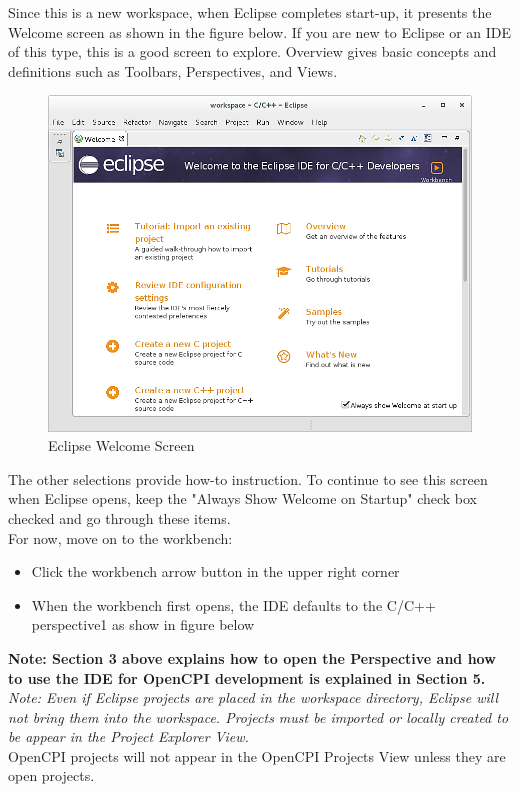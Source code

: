 \documentclass[10pt, a4paper, oneside]{article}
\begin{document}
Since this is a new workspace, when Eclipse completes start-up, it presents the Welcome screen as shown in the figure below. If you are new to Eclipse or an IDE of this type, this is a good screen to explore. Overview gives basic concepts and definitions such as Toolbars, Perspectives, and Views.
\begin{figure}[h!]
	\centering
	\caption{Eclipse Welcome Screen}{}
	\includegraphics[width=.70\textwidth]{EclipseWelcomeScreen.png}
 \end{figure}
The other selections provide how-to instruction. To continue to see this screen when Eclipse opens, keep the "Always Show Welcome on Startup" check box checked and go through these items. \\

For now, move on to the workbench:
\begin{itemize}
\item Click the workbench arrow button in the upper right corner
\item When the workbench first opens, the IDE defaults to the C/C++ perspective1 as show in figure below
\end{itemize}
 {\textbf {Note: Section 3 above explains how to open the Perspective and how to use the IDE for OpenCPI development is explained in Section 5.}}\\

\emph{Note: Even if Eclipse projects are placed in the workspace directory, Eclipse will not bring them into the workspace. Projects must be imported or locally created to be appear in the Project Explorer View.}\\

OpenCPI projects will not appear in the OpenCPI Projects View unless they are open projects.\\
\end{document}
